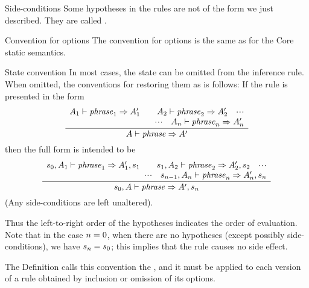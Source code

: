 \begin{definition}{Side-conditions}
Some hypotheses in the rules are not of the form we just described. They
are called .
\end{definition}

\begin{clause}{Convention for options}
The convention for options is the same as for the Core static semantics.
\end{clause}

\begin{convention}{State convention}
In most cases, the state can be omitted from the inference rule. When
omitted, the conventions for restoring them as is follows:
If the rule is presented in the
form
\begin{equation*}
 \frac{ \begin{array}{r}
        A_{1}\vdash\textit{phrase\/}_{1}\Rightarrow A'_{1}\qquad
        A_{2}\vdash\textit{phrase\/}_{2}\Rightarrow A'_{2}\quad\mbox{$\cdot\!\cdot\!\cdot$}\\
        \mbox{$\cdot\!\cdot\!\cdot$}\quad A_{n}\vdash\textit{phrase\/}_{n}\Rightarrow A'_{n}
        \end{array}
      }
      { A\vdash\textit{phrase\/}\Rightarrow A'}
\end{equation*}
then the full form is intended to be
\begin{equation*}
\frac{ \begin{array}{r}
       s_{0},A_{1}\vdash\textit{phrase\/}_{1}\Rightarrow A'_{1},s_{1}\qquad
       s_{1},A_{2}\vdash\textit{phrase\/}_{2}\Rightarrow A'_{2},s_{2}\quad\mbox{$\cdot\!\cdot\!\cdot$}\\
       \mbox{$\cdot\!\cdot\!\cdot$}\quad s_{n-1},A_{n}\vdash\textit{phrase\/}_{n}\Rightarrow A'_{n},s_{n}
       \end{array}
     }
     { s_{0},A\vdash\textit{phrase\/}\Rightarrow A',s_{n}}
\end{equation*}
(Any side-conditions are left unaltered).

Thus the left-to-right order of the hypotheses indicates the order of
evaluation.  Note that in the case $n=0$, when there are no hypotheses
(except possibly side-conditions), we have $s_{n}=s_{0}$; this implies that the
rule causes no side effect.

The Definition calls this convention the , and
it must be applied to each version of a rule obtained by inclusion or
omission of its options.
\end{convention}

